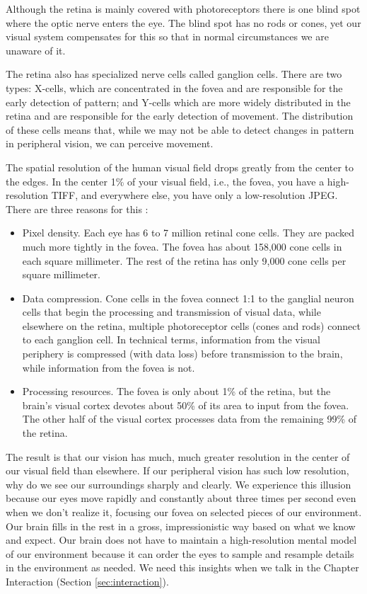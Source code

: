 \documentclass[
]{book}
\providecommand{\tightlist}{%
  \setlength{\itemsep}{0pt}\setlength{\parskip}{0pt}}
\begin{document}
Although the retina is mainly covered with photoreceptors there is one blind spot where the optic nerve enters the eye. The blind spot has no rods or cones, yet our visual system compensates for this so that in normal circumstances we are unaware of it.

The retina also has specialized nerve cells called ganglion cells. There are two types: X-cells, which are concentrated in the fovea and are responsible for the early detection of pattern; and Y-cells which are more widely distributed in the retina and are responsible for the early detection of movement. The distribution of these cells means that, while we may not be able to detect changes in pattern in peripheral vision, we can perceive movement.

The spatial resolution of the human visual field drops greatly from the center to the edges. In the center 1\% of your visual field, i.e., the fovea, you have a high-resolution TIFF, and everywhere else, you have only a low-resolution JPEG. There are three reasons for this \citep{Johnson2014designingwiththemind}:

\begin{itemize}
\tightlist
\item
  Pixel density. Each eye has 6 to 7 million retinal cone cells. They are packed much more tightly in the fovea. The fovea has about 158,000 cone cells in each square millimeter. The rest of the retina has only 9,000 cone cells per square millimeter.
\item
  Data compression. Cone cells in the fovea connect 1:1 to the ganglial neuron cells that begin the processing and transmission of visual data, while elsewhere on the retina, multiple photoreceptor cells (cones and rods) connect to each ganglion cell. In technical terms, information from the visual periphery is compressed (with data loss) before transmission to the brain, while information from the fovea is not.
\item
  Processing resources. The fovea is only about 1\% of the retina, but the brain's visual cortex devotes about 50\% of its area to input from the fovea. The other half of the visual cortex processes data from the remaining 99\% of the retina.
\end{itemize}

The result is that our vision has much, much greater resolution in the center of our visual field than elsewhere. If our peripheral vision has such low resolution, why do we see our surroundings sharply and clearly. We experience this illusion because our eyes move rapidly and constantly about three times per second even when we don't realize it, focusing our fovea on selected pieces of our environment. Our brain fills in the rest in a gross, impressionistic way based on what we know and expect. Our brain does not have to maintain a high-resolution mental model of our environment because it can order the eyes to sample and resample details in the environment as needed. We need this insights when we talk in the Chapter Interaction (Section \ref{sec:interaction}).
\end{document}
